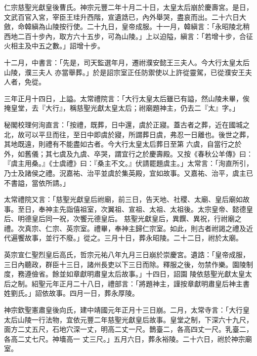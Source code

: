 \begin{pinyinscope}
 仁宗慈聖光獻皇後曹氏。神宗元豐二年十月二十日，太皇太后崩於慶壽宮。是日，文武百官入宮，宰臣王珪升西階，宣遺誥已，內外舉哭，盡哀而出。二十六日大斂，命韓縝為山陵按行使。二十九日，皇帝成服。十一月，韓縝言：「永昭陵北稍西地二百十步內，取方六十五步，可為山陵。」上以迫隘，縝言：「若增十步，合征火相主及中五之數。」詔增十步。



 十二月，中書言：「先是，司天監選年月，遷祔濮安懿王三夫人。今大行太皇太后山陵，濮三夫人
 亦當舉葬。」於是詔宗室正任防禦使以上許從靈駕，已從濮安王夫人者，免從。



 三年正月十四日，上謚。太常禮院言：「大行太皇太后雖已有謚，然山陵未畢，俟掩皇堂，去『大行』，稱慈聖光獻太皇太后；祔廟題神主，仍去二『太』字。」



 秘閣校理何洵直言：「按禮，既葬，日中還，虞於正寢。蓋古者之葬，近在國城之北，故可以平旦而往，至日中即虞於寢，所謂葬日虞，弗忍一日離也。後世之葬，其地既遠，則禮有不能盡如古者。今大行太皇太后葬日至第
 六虞，自當行之於外，如舊儀；其七虞及九虞、卒哭，謂宜行之於慶壽殿。又按《春秋公羊傳》曰：『虞主用桑。』《士虞禮》曰：『桑主不文。』伏請罷題虞主。」太常言：「洵直所引，乃士及諸侯之禮。況嘉祐、治平並虞於集英殿，宜如故事。又嘉祐、治平，虞主已不書謚，當依所請。」



 太常禮院又言：「慈聖光獻皇后祔廟，前三日，告天地、社稷、太廟、皇后廟如故事。至日，奉神主先詣僖祖室，次翼祖、宣祖、太祖、太祖後。太宗皇帝、懿德皇后、明德皇后同一祝，次饗元德皇后。
 慈聖光獻皇后，異饌、異祝，行祔廟之禮。次真宗、仁宗、英宗室。禮畢，奉神主歸仁宗室。如此，則古者祔謁之禮及近代遍饗故事，並行不廢。」從之。三月十日，葬永昭陵。二十二日，祔於太廟。



 英宗宣仁聖烈皇后高氏，哲宗元祐八年九月三日崩於崇慶宮。遺誥：「皇帝成服，三日內聽政，群臣十三日，諸州長吏以下三日而除。釋服之後，勿禁作樂。園陵制度，務遵儉省。餘並如章獻明肅皇太后故事。」十四日，詔園
 陵依慈聖光獻太皇太后之制。紹聖元年正月二十八日，禮部言：「將題神主，謹按章獻明肅皇后神主書姓劉氏。」詔依故事。四月一日，葬永厚陵。



 神宗欽聖憲肅皇後向氏，建中靖國元年正月十三日崩。二月，太常寺言：「大行皇太后山陵一行法物，宜依元豐二年慈聖光獻皇后故事。皇堂之制，下深六十九尺，面方二丈五尺，石地穴深一丈，明高二丈一尺。鵲臺二，各高四丈一尺。乳臺二，各高二丈七尺。神墻高一
 丈三尺。」五月六日，葬永裕陵。二十六日，祔於神宗廟室。




\end{pinyinscope}
